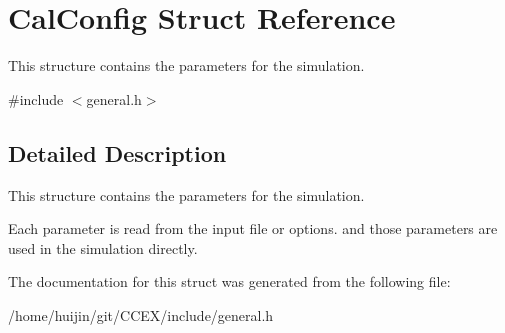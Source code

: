 \hypertarget{structCalConfig}{\section{Cal\-Config Struct Reference}
\label{structCalConfig}
}


This structure contains the parameters for the simulation.  




{\ttfamily \#include $<$general.\-h$>$}



\subsection{Detailed Description}
This structure contains the parameters for the simulation. 

Each parameter is read from the input file or options. and those parameters are used in the simulation directly. 

The documentation for this struct was generated from the following file\-:\begin{DoxyCompactItemize}
\item 
/home/huijin/git/\-C\-C\-E\-X/include/general.\-h\end{DoxyCompactItemize}
